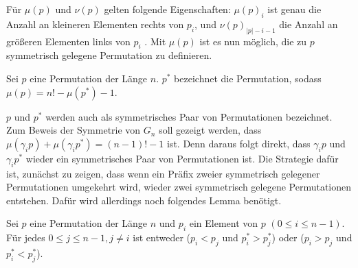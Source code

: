 \documentclass[a4paper, 10pt, ngerman]{article}
\begin{document}
Für $\mu(p)$ und $\nu(p)$ gelten folgende Eigenschaften: $\mu(p)_i$ ist genau die Anzahl an kleineren Elementen rechts von $p_i$, und $\nu(p)_{|p| - i - 1}$ die Anzahl an größeren Elementen links von $p_i$ \cite{factorial}. Mit $\mu(p)$ ist es nun möglich, die zu $p$ symmetrisch gelegene Permutation zu definieren.

\begin{definition}
    Sei $p$ eine Permutation der Länge $n$. $p^*$ bezeichnet die Permutation, sodass $\mu(p) = n! - \mu(p^*) - 1$.
\end{definition}

$p$ und $p^*$ werden auch als symmetrisches Paar von Permutationen bezeichnet. Zum Beweis der Symmetrie von $G_n$ soll gezeigt werden, dass $\mu(\gamma_i p) + \mu(\gamma_i p^*) = (n - 1)! - 1$ ist. Denn daraus folgt direkt, dass $\gamma_i p$ und $\gamma_i p^*$ wieder ein symmetrisches Paar von Permutationen ist. Die Strategie dafür ist, zunächst zu zeigen, dass wenn ein Präfix zweier symmetrisch gelegener Permutationen umgekehrt wird, wieder zwei symmetrisch gelegene Permutationen entstehen. Dafür wird allerdings noch folgendes Lemma benötigt.

\begin{lemma}
    Sei $p$ eine Permutation der Länge $n$ und $p_i$ ein Element von $p$ $(0 \le i \le n - 1)$. Für jedes $0 \le j \le n-1, j \ne i$ ist entweder ($p_i < p_j$ und $p^*_i > p^*_j$) oder ($p_i > p_j$ und $p^*_i < p^*_j$).
\end{lemma}
\end{document}

